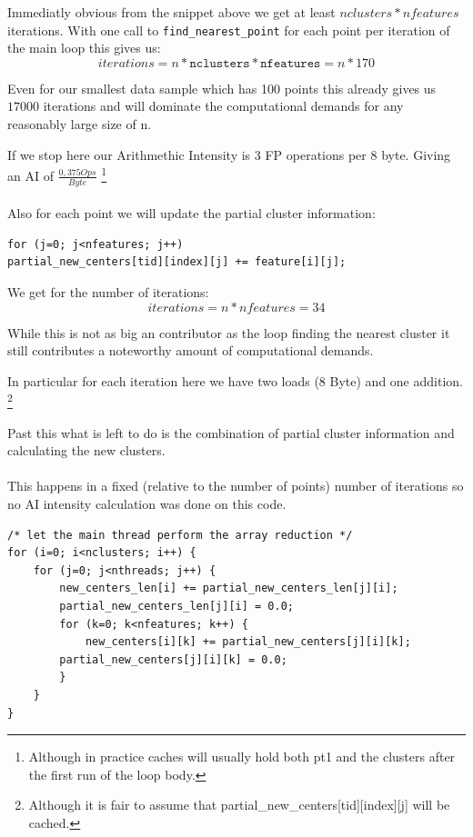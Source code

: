 Immediatly obvious from the snippet above we get at least $nclusters * nfeatures$ iterations.
With one call to \texttt{find\_nearest\_point} for each point per iteration of the main loop this gives us:\\
$$iterations = n * \texttt{nclusters} * \texttt{nfeatures} = n * 170$$

Even for our smallest data sample which has 100 points this already gives us $17000$ iterations and will dominate the computational demands for any reasonably large size of n.

If we stop here our Arithmethic Intensity is 3 FP operations per 8 byte. Giving an AI of $\frac{0,375 Ops}{Byte}$
\footnote{Although in practice caches will usually hold both pt1 and the clusters after the first run of the loop body.}


\paragraph{}
Also for each point we will update the partial cluster information:
\begin{lstlisting}[caption={Updating (partial) cluster information},label=lblUpdPartClst]
for (j=0; j<nfeatures; j++)
partial_new_centers[tid][index][j] += feature[i][j];
\end{lstlisting}
We get for the number of iterations:
$$iterations = n * nfeatures = 34$$

While this is not as big an contributor as the loop finding the nearest cluster
it still contributes a noteworthy amount of computational demands.

In particular for each iteration here we have two loads (8 Byte) and one addition.
\footnote{Although it is fair to assume that partial\_new\_centers[tid][index][j] will be cached.}

Past this what is left to do is the combination of partial cluster information and calculating the new clusters.

\paragraph{} This happens in a fixed (relative to the number of points) number of iterations so no AI intensity calculation was done on this code.


\begin{lstlisting}[caption={Reduction pt1}]
/* let the main thread perform the array reduction */
for (i=0; i<nclusters; i++) {
	for (j=0; j<nthreads; j++) {
		new_centers_len[i] += partial_new_centers_len[j][i];
		partial_new_centers_len[j][i] = 0.0;
		for (k=0; k<nfeatures; k++) {
			new_centers[i][k] += partial_new_centers[j][i][k];
		partial_new_centers[j][i][k] = 0.0;
		}
	}
}
\end{lstlisting}

